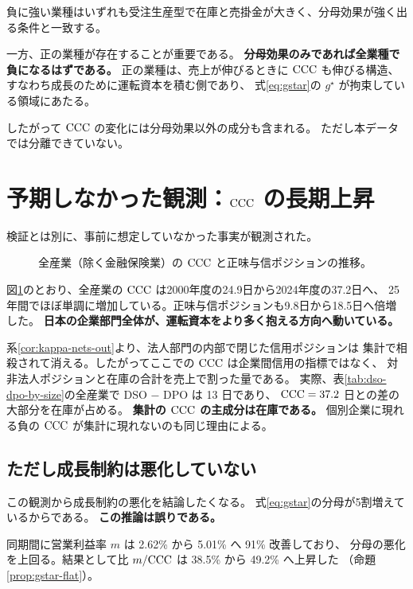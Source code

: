 負に強い業種はいずれも受注生産型で在庫と売掛金が大きく、分母効果が強く出る条件と一致する。

一方、正の業種が存在することが重要である。
\textbf{分母効果のみであれば全業種で負になるはずである。}
正の業種は、売上が伸びるときに $\mathrm{CCC}$ も伸びる構造、
すなわち成長のために運転資本を積む側であり、
式\eqref{eq:gstar}の $g^\star$ が拘束している領域にあたる。

したがって $\mathrm{CCC}$ の変化には分母効果以外の成分も含まれる。
ただし本データでは分離できていない。

\section{予期しなかった観測：\texorpdfstring{$\mathrm{CCC}$}{CCC} の長期上昇}

検証とは別に、事前に想定していなかった事実が観測された。

\begin{figure}[htbp]
\centering
{}
\caption{全産業（除く金融保険業）の $\mathrm{CCC}$ と正味与信ポジションの推移。}
\label{fig:ccc-trend}
\end{figure}

図\ref{fig:ccc-trend}のとおり、全産業の $\mathrm{CCC}$ は2000年度の24.9日から2024年度の37.2日へ、
25年間でほぼ単調に増加している。正味与信ポジションも9.8日から18.5日へ倍増した。
\textbf{日本の企業部門全体が、運転資本をより多く抱える方向へ動いている。}

\begin{remark}[集計値が測っているもの]
系\ref{cor:kappa-nets-out}より、法人部門の内部で閉じた信用ポジションは
集計で相殺されて消える。したがってここでの $\mathrm{CCC}$ は企業間信用の指標ではなく、
対非法人ポジションと在庫の合計を売上で割った量である。
実際、表\ref{tab:dso-dpo-by-size}の全産業で DSO $-$ DPO は 13 日であり、
$\mathrm{CCC}=37.2$ 日との差の大部分を在庫が占める。
\textbf{集計の $\mathrm{CCC}$ の主成分は在庫である。}
個別企業に現れる負の $\mathrm{CCC}$ が集計に現れないのも同じ理由による。
\end{remark}

\subsection{ただし成長制約は悪化していない}

この観測から成長制約の悪化を結論したくなる。
式\eqref{eq:gstar}の分母が5割増えているからである。
\textbf{この推論は誤りである。}

同期間に営業利益率 $m$ は 2.62\% から 5.01\% へ 91\% 改善しており、
分母の悪化を上回る。結果として比 $m/\mathrm{CCC}$ は 38.5\% から 49.2\% へ上昇した
（命題\ref{prop:gstar-flat}）。

